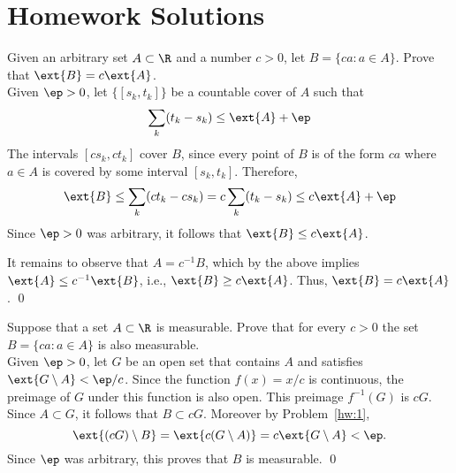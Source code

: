 \newpage
\section{Homework Solutions}


\begin{hwsol}
Given an arbitrary set $A \subset \R$ and a number $c>0$, let $B = \{ ca \colon a \in A \}$. Prove that $\ext{B} = c \ext{A}$. \\

\pf Given $\ep>0$, let $\{[s_k, t_k]\}$ be a countable cover of $A$ such that 
        \[
        \sum_k (t_k-s_k) \leq  \ext{A} + \ep 
        \]
The intervals $[c s_k, c t_k]$ cover $B$, since every point of $B$ is of the form $ca$ where $a\in A$ is covered by some interval $[s_k, t_k]$. Therefore, 
        \[
        \ext{B} \leq \sum_k (ct_k-cs_k)= c \sum_k (t_k-s_k) \le  c \ext{A} + \ep
        \]
Since $\ep>0$ was arbitrary, it follows that $\ext{B} \le c \ext{A}$.

It remains to observe that $A=c^{-1} B$, which by the above implies $\ext{A} \leq c^{-1} \ext{B}$, i.e., $\ext{B} \geq c \ext{A}$. Thus,  $\ext{B} = c \ext{A}$. \qed \\
\end{hwsol}


\begin{hwsol} 
Suppose that a set $A \subset \R$ is measurable. Prove that for every $c>0$ the set $B = \{ ca \colon a \in A \}$ is also measurable. \\

\pf Given $\ep>0$, let $G$ be an open set that contains $A$ and satisfies $\ext{G \setminus A} <  \ep/c$. Since the function $f(x) = x/c$ is continuous, the preimage of $G$ under this function is also open. This preimage $f^{-1}(G)$ is $cG$. Since $A \subset G$, it follows that $B \subset cG$. Moreover by Problem~\ref{hw:1},
        \[
        \ext{(cG)\setminus B}= \ext{c(G\setminus A)}=  c \ext{G \setminus A} < \ep.
        \]
Since $\ep$ was arbitrary, this  proves that $B$ is measurable. \qed \\
\end{hwsol}


